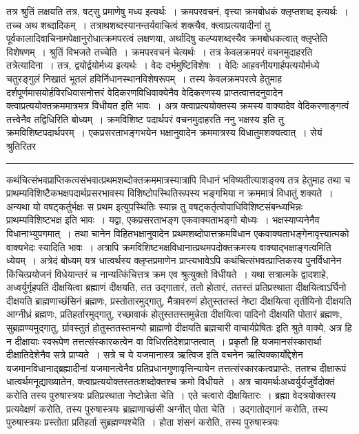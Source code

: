 \documentclass[11pt, openany]{book}
\begin{document}
 तत्र श्रुतिं लक्षयति तत्र, षट्सु प्रमाणेषु मध्य इत्यर्थः~। क्रमपरवचनं, वृत्त्या क्रमबोधकं क्लृप्तशब्द इत्यर्थः~। तच्च {\qt अथ} शब्दादिकम्~। तत्राथशब्दस्यानन्तर्यवाचित्वं शक्त्यैव, क्त्वाप्रत्ययादीनां तु पूर्वकालादिवाचिनामपेक्षानुरोधात्क्रमपरत्वं लक्षणया, अर्थादिषु कल्प्यशब्दस्यैव क्रमबोधकत्वात् क्लृप्तेति विशेषणम्~। श्रुतिं विभजते {\br तच्चेति~।}  क्रमपरवचनं चेत्यर्थः~। तत्र केवलक्रमपरं वचनमुदाहरति {\br तत्रेत्यादिना~।} तत्र, द्वयोर्द्वयोर्मध्य इत्यर्थः~। वेदः दर्भमुष्टिविशेषः~। वेदिः आहवनीयगार्हपत्ययोर्मध्ये चतुरङ्गुलं निखातं भूतलं हविर्निधानस्थानविशेषरूपम्~। तस्य केवलक्रमपरत्वे हेतुमाह दर्शपूर्णमासयोर्हविरधिवासनोत्तरं वेदिकरणविधिवाक्येनैव वेदिकरणस्य प्राप्तत्वात्तदनुवादेन क्त्वाप्रत्ययोक्तक्रममात्रमत्र विधीयत इति भावः~। अत्र
क्त्वाप्रत्ययोक्तस्य क्रमस्य वाक्यादेव वेदिकरणाङ्गत्वं तत्त्वेनैव तद्विधिरिति बोध्यम्~। क्रमविशिष्ट पदार्थपरं वचनमुदाहरति {\br ननु} भक्षस्य
\newpage
\fancyhead[RE]{[ श्रुति\textemdash\ }
{\bl{} इति तु क्रमविशिष्टपदार्थपरम्~। एकप्रसरताभङ्गभयेन भक्षानुवादेन क्रममात्रस्य विधातुमशक्यत्वात्~। सेयं श्रुतिरितर\\} 
\hrule
\vspace{3mm}
\noindent
कथंचित्संभवप्राप्तिकत्वसंभवात्प्रथमशब्दोक्तक्रममात्रस्यात्रापि विधानं भविष्यतीत्याशङ्क्य तत्र हेतुमाह तथा च
प्राथम्यविशिष्टैकभक्षपदार्थप्रसरभावस्य विशिष्टोपस्थितिरूपस्य भङ्गभिया न क्रममात्रं विधातुं शक्यते~। अन्यथा यो वषट्कर्तुर्भक्षः स प्रथम इत्युपस्थितिः स्यान्न तु वषट्कर्तृत्वोपाधिविशिष्टसंबन्ध्यभिन्नः प्राथम्यविशिष्टभक्ष इति भावः~। यद्वा, एकप्रसरताभङ्ग एकवाक्यताभङ्गो बोध्यः~। भक्षस्याप्यनेनैव विधानाभ्युपगमात्~। तथा चानेन विहितभक्षानुवादेन प्रथमशब्दोपात्तक्रमविधान एकवाक्यताभङ्गेनावृत्त्यात्मको वाक्यभेदः स्यादिति भावः~। अत्रापि क्रमविशिष्टभक्षविधानात्प्रथमपदोक्तक्रमस्य
वाक्याद्भक्षाङ्गत्वमिति ध्येयम्~। {\br अत्रेदं बोध्यम्} यत्र धात्वर्थस्य क्लृप्तप्रमाणेन प्राप्त्यभावेऽपि कथंचित्संभवत्प्राप्तिकस्य पुनर्विधानेन किंचित्प्रयोजनं विधेयान्तरं च नान्यत्किंचित्तत्र क्रम एव श्रुत्युक्तो विधीयते~। यथा सत्रात्मके द्वादशाहे, अध्वर्युर्गृहपतिं दीक्षयित्वा ब्रह्माणं दीक्षयति, तत उद्गातारं, ततो होतारं, ततस्तं प्रतिप्रस्थाता
दीक्षयित्वाऽर्घिनो दीक्षयति ब्राह्मणाच्छंसिनं ब्रह्मणः, प्रस्तोतारमुद्गातु, मैत्रावरुणं होतुस्ततस्तं नेष्टा दीक्षयित्वा तृतीयिनो दीक्षयति आग्नीध्रं ब्रह्मणः, प्रतिहर्तारमुद्गातु, रच्छावाकं
होतुस्ततस्तमुन्नेता दीक्षयित्वा पादिनो दीक्षयति पोतारं ब्रह्मणः, सुब्रह्मण्यमुद्गातु, र्ग्रावस्तुतं होतुस्ततस्तमन्यो ब्राह्मणो दीक्षयति ब्रह्मचारी वाचार्यप्रेषितः इति श्रुते वाक्ये, अत्र हि न दीक्षायाः स्वरूपेण तत्तत्संस्कारकत्वेन वा विधिरतिदेशप्राप्तत्वात्~। प्रकृतौ हि यजमानसंस्कारार्था दीक्षातिदेशेनैव सत्रे प्राप्यते~। सत्रे च ये यजमानास्त्र ऋत्विज इति वचनेन ऋत्विक्कार्योद्देशेन यजमानविधानाद्ब्रह्मादीनां यजमानत्वेनैव प्रतिप्रधानगुणावृत्तिन्यायेन तत्तत्संस्कारकत्वप्राप्तेः, ततश्च दीक्षारूपं धात्वर्थमनूद्याख्यातेन, क्त्वाप्रत्ययोक्तस्ततःशब्दोक्तश्च क्रमो विधीयते~। अत्र चायमर्थः\textendash अध्वर्युर्यजुर्वेदोक्तं करोति तस्य पुरुषास्त्रयः प्रतिप्रस्थाता नेष्टोन्नेता चेति~। एते चत्वारो दीक्षयितारः~। ब्रह्मा वेदत्रयोक्तस्य प्रत्यवेक्षणं करोति, तस्य पुरुषास्त्रयः ब्राह्मणाच्छंसी अग्नीत् पोता चेति~। उद्गातोद्गानं करोति, तस्य पुरुषास्त्रयः प्रस्तोता प्रतिहर्ता सुब्रह्मण्यश्चेति~। होता शंसनं करोति, तस्य पुरुषास्त्रयः
\end{document}
